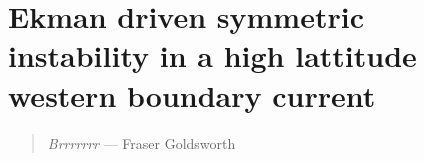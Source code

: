 \chapter{Ekman driven symmetric instability in a high lattitude western boundary current}
\begin{quote}
    \textit{Brrrrrrr} --- Fraser Goldsworth
\end{quote}